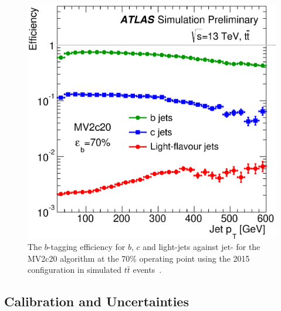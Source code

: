 \begin{figure}[!htb]
  \begin{center}
    \includegraphics[width=0.5\linewidth, angle=0]{figs/Objects/bjets_perf_pt.eps} 
  \end{center}
  \vspace{-1em}
  \caption[The $b$-tagging efficiency for $b$-jets, $c$-jets and light-jets as a function of jet-\pT{} for the MV2c20 algorithm at the 70\% operating point in the 2015 configuration.]
          {\label{fig:obj-bjets_perf_pt}The $b$-tagging efficiency for $b$, $c$ and light-jets against jet-\pT{} 
            for the MV2c20 algorithm at the 70\% operating point using the 2015 configuration in simulated $t\bar{t}$ events~\cite{obj-bjets_algo_2015}.}
\end{figure}

\subsection{Calibration and Uncertainties}
\label{sec:obj-bjets_calib}

